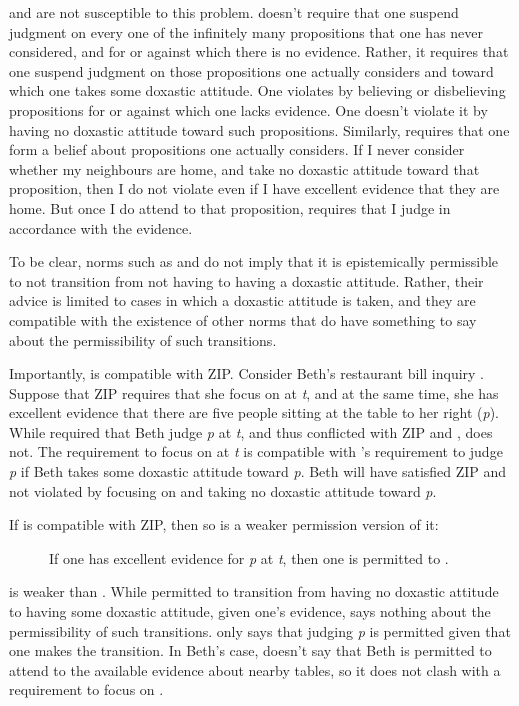 \documentclass[12pt]{article}
\begin{document}
\eoc{} and \soc{} are not susceptible to this problem. \soc{} doesn't require that one suspend judgment on every one of the infinitely many propositions that one has never considered, and for or against which there is no evidence. Rather, it requires that one suspend judgment on those propositions one actually considers and toward which one takes some doxastic attitude. One violates \soc{} by believing or disbelieving propositions for or against which one lacks evidence. One doesn't violate it by having no doxastic attitude toward such propositions. Similarly, \eoc{} requires that one form a belief about propositions one actually considers. If I never consider whether my neighbours are home, and take no doxastic attitude toward that proposition, then I do not violate \eoc{} even if I have excellent evidence that they are home. But once I do attend to that proposition, \eoc{} requires that I judge in accordance with the evidence.

To be clear, norms such as \eoc{} and \soc{} do not imply that it is epistemically permissible to not transition from not having to having a doxastic attitude. Rather, their advice is limited to cases in which a doxastic attitude is taken, and they are compatible with the existence of other norms that do have something to say about the permissibility of such transitions.

Importantly, \eoc{} is compatible with ZIP. Consider Beth's restaurant bill inquiry . Suppose that ZIP requires that she focus on  at \textit{t}, and at the same time, she has excellent evidence that there are five people sitting at the table to her right (\textit{p}). While \eo{} required that Beth judge \textit{p} at \textit{t}, and thus conflicted with ZIP and \js{}, \eoc{} does not. The requirement to focus on  at \textit{t} is compatible with \eoc{}'s requirement to judge \textit{p} if Beth takes some doxastic attitude toward \textit{p}. Beth will have satisfied ZIP and not violated \eoc{} by focusing on  and taking no doxastic attitude toward \textit{p}.

If \eoc{} is compatible with ZIP, then so is a weaker permission version of it:

\begin{description}
    \item[\epc] If one has excellent evidence for \textit{p} at \textit{t}, then one is permitted to \judif{}.
\end{description}
%
\epc{} is weaker than \ep{}. While \ep{} permitted to transition from having no doxastic attitude to having some doxastic attitude, given one's evidence, \epc{} says nothing about the permissibility of such transitions. \epc{} only says that judging \textit{p} is permitted given that one makes the transition. In Beth's case, \epc{} doesn't say that Beth is permitted to attend to the available evidence about nearby tables, so it does not clash with a requirement to focus on .
\end{document}
